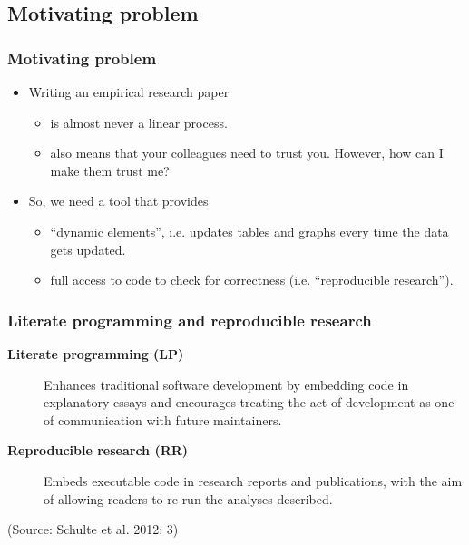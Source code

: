 \documentclass[bigger]{beamer}
\begin{document}
\subsection{Motivating problem}
\label{sec-2-1}
\begin{frame}
\frametitle{Motivating problem}
\label{sec-2-1-1}


\begin{itemize}
\item Writing an empirical research paper
\begin{itemize}
\item is almost never a linear process.
\item also means that your colleagues need to trust you. However, how can I make them
    trust me?
\end{itemize}
\item So, we need a tool that provides
\begin{itemize}
\item \enquote{dynamic elements}, i.e. updates tables and graphs every time the data gets updated.
\item full access to code to check for correctness (i.e. \enquote{reproducible research}).
\end{itemize}
\end{itemize}
\end{frame}
\begin{frame}
\frametitle{Literate programming and reproducible research}
\label{sec-2-1-2}


\begin{description}
\item[\textbf{Literate programming (LP)}] Enhances traditional software development by
     embedding code in explanatory essays and encourages treating the
     act of development as one of communication with future
     maintainers.
\item[\textbf{Reproducible research (RR)}] Embeds executable code in research reports
     and publications, with the aim of allowing readers to re-run the
     analyses described.
\end{description}

     
(Source: Schulte et al. 2012: 3)
\end{frame}
\end{document}
